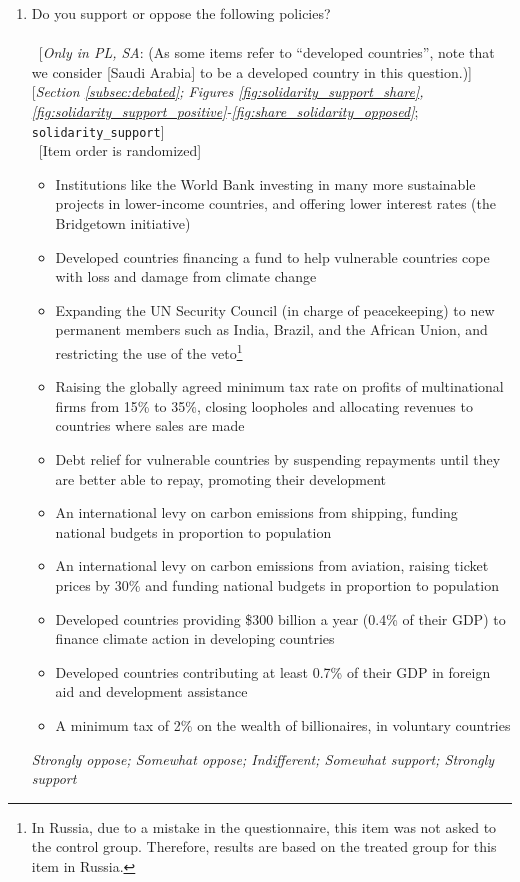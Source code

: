 \documentclass[12pt,english]{article}
\begin{document}
\begin{bibunit}
\begin{enumerate}[resume]
\item  \label{q:solidarity_support} Do you support or oppose the following policies?\\
~\\ 
~[\textit{Only in PL, SA}: (As some items refer to ``developed countries'', note that we consider [Saudi Arabia] to be a developed country in this question.)] [\textit{Section \ref{subsec:debated}; Figures \ref{fig:solidarity_support_share}, \ref{fig:solidarity_support_positive}-\ref{fig:share_solidarity_opposed}}; 
\verb|solidarity_support|] \\
~[Item order is randomized]
\begin{itemize}
    \item Institutions like the World Bank investing in many more sustainable projects in lower-income countries, and offering lower interest rates (the Bridgetown initiative)
    \item Developed countries financing a fund to help vulnerable countries cope with loss and damage from climate change
    \item Expanding the UN Security Council (in charge of peacekeeping) to new permanent members such as India, Brazil, and the African Union, and restricting the use of the veto\footnote{In Russia, due to a mistake in the questionnaire, this item was not asked to the control group. Therefore, results are based on the treated group for this item in Russia. }
    \item Raising the globally agreed minimum tax rate on profits of multinational firms from 15\% to 35\%, closing loopholes and allocating revenues to countries where sales are made
    \item Debt relief for vulnerable countries by suspending repayments until they are better able to repay, promoting their development
    \item An international levy on carbon emissions from shipping, funding national budgets in proportion to population
    \item An international levy on carbon emissions from aviation, raising ticket prices by 30\% and funding national budgets in proportion to population
    \item Developed countries providing \$300 billion a year (0.4\% of their GDP) to finance climate action in developing countries
    \item Developed countries contributing at least 0.7\% of their GDP in foreign aid and development assistance
    \item A minimum tax of 2\% on the wealth of billionaires, in voluntary countries
\end{itemize}
\textit{Strongly oppose; Somewhat oppose; Indifferent; Somewhat support; Strongly support}
\end{enumerate} 


\end{bibunit}
\end{document}
